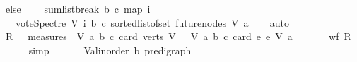 \begin{isabellebody}
\ else\ \isanewline
\ \ \ sumlist{\isacharunderscore}{\kern0pt}break\ b\ c\ {\isacharparenleft}{\kern0pt}map\ {\isacharparenleft}{\kern0pt}{\isasymlambda}i{\isachardot}{\kern0pt}\isanewline
\ \ \ {\isacharparenleft}{\kern0pt}vote{\isacharunderscore}{\kern0pt}Spectre\ V\ i\ b\ c{\isacharparenright}{\kern0pt}{\isacharparenright}{\kern0pt}\ {\isacharparenleft}{\kern0pt}sorted{\isacharunderscore}{\kern0pt}list{\isacharunderscore}{\kern0pt}of{\isacharunderscore}{\kern0pt}set\ {\isacharparenleft}{\kern0pt}future{\isacharunderscore}{\kern0pt}nodes\ V\ a{\isacharparenright}{\kern0pt}{\isacharparenright}{\kern0pt}{\isacharparenright}{\kern0pt}{\isacharparenright}{\kern0pt}{\isachardoublequoteclose}\isanewline
%
\isadelimproof
\ \ %
\endisadelimproof
%
\isatagproof
{}\isamarkupfalse%
\ auto%
\endisatagproof
{\isafoldproof}%
%
\isadelimproof
\isanewline
%
\endisadelimproof
{}\isamarkupfalse%
\isanewline
%
\isadelimproof
%
\endisadelimproof
%
\isatagproof
{}\isamarkupfalse%
\isanewline
{}\isamarkupfalse%
\ {\isacharquery}{\kern0pt}R\ {\isacharequal}{\kern0pt}\ {\isachardoublequoteopen}\ measures\ {\isacharbrackleft}{\kern0pt}{\isacharparenleft}{\kern0pt}\ {\isasymlambda}{\isacharparenleft}{\kern0pt}V{\isacharcomma}{\kern0pt}\ a{\isacharcomma}{\kern0pt}\ b{\isacharcomma}{\kern0pt}\ c{\isacharparenright}{\kern0pt}{\isachardot}{\kern0pt}\ {\isacharparenleft}{\kern0pt}card\ {\isacharparenleft}{\kern0pt}verts\ V{\isacharparenright}{\kern0pt}{\isacharparenright}{\kern0pt}{\isacharparenright}{\kern0pt}{\isacharcomma}{\kern0pt}\ \ {\isacharparenleft}{\kern0pt}\ {\isasymlambda}{\isacharparenleft}{\kern0pt}V{\isacharcomma}{\kern0pt}\ a{\isacharcomma}{\kern0pt}\ b{\isacharcomma}{\kern0pt}\ c{\isacharparenright}{\kern0pt}{\isachardot}{\kern0pt}\ card\ {\isacharbraceleft}{\kern0pt}e{\isachardot}{\kern0pt}\ e\ {\isasymrightarrow}\isactrlsup {\isacharasterisk}{\kern0pt}\isactrlbsub V\isactrlesub \ a{\isacharbraceright}{\kern0pt}{\isacharparenright}{\kern0pt}{\isacharbrackright}{\kern0pt}\ {\isachardoublequoteclose}\ \ \isanewline
\ \ \isamarkupfalse%
\ {\isachardoublequoteopen}wf\ {\isacharquery}{\kern0pt}R{\isachardoublequoteclose}\isanewline
\ \ \ \ \isamarkupfalse%
\ simp\ \isanewline
{}\isamarkupfalse%
\ \isanewline
\ \ \isamarkupfalse%
\ V{\isacharcolon}{\kern0pt}{\isacharcolon}{\kern0pt}{\isachardoublequoteopen}{\isacharparenleft}{\kern0pt}{\isacharprime}{\kern0pt}a{\isacharcolon}{\kern0pt}{\isacharcolon}{\kern0pt}linorder{\isacharcomma}{\kern0pt}\ {\isacharprime}{\kern0pt}b{\isacharparenright}{\kern0pt}\ pre{\isacharunderscore}{\kern0pt}digraph{\isachardoublequoteclose}\ \isanewline

\end{isabellebody}
